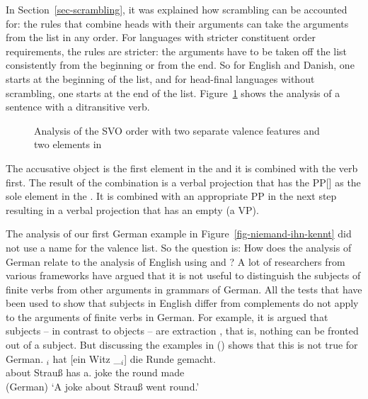 In Section~\ref{sec-scrambling}, it was explained how scrambling can be accounted for: the rules that
combine heads with their arguments can take the arguments from the list in any order. For languages
with stricter constituent order requirements, the rules are stricter: the arguments have to be taken
off the list consistently from the beginning or from the end. So for English and Danish, one starts
at the beginning of the list, and for head-final languages without scrambling, one starts at the end
of the list. Figure~\ref{fig-svo-ditrans} shows the analysis of a sentence with a ditransitive verb.
\begin{figure}
\caption{\label{fig-svo-ditrans}Analysis of the SVO order with two separate valence features and two
  elements in \comps}
\end{figure}
The accusative object is the first element in the \compsl and it is combined with the verb
first. The result of the combination is a verbal projection that has the PP[] as the sole
element in the \compsl. It is combined with an appropriate PP in the next step resulting in a verbal
projection that has an empty \compsl (a VP).


The analysis of our first German example in Figure~\ref{fig-niemand-ihn-kennt} did not use a name
for the valence list. So the question is: How does the analysis of German relate to the analysis of
English using \spr and \comps? A lot of researchers from various frameworks have argued that it is not
useful to distinguish the subjects of finite verbs from other arguments in grammars of German. All the tests that have
been used to show that subjects in English differ from complements do not apply to the arguments of
finite verbs in German. For example, it is argued that subjects – in contrast to objects – are extraction , that is, nothing can be
fronted out of a subject. But \citet[]{Haider93a} discussing the examples in () shows that this is not true for
German.
\eal
\ex 
{}$_i$ hat [ein        Witz \_$_i$] die Runde gemacht.\\
     \spacebr{}about Strauß      has \spacebr{}a.\NOM{} joke {}      the round made\\\hfill(German)
\glt `A joke about Strauß went round.'

